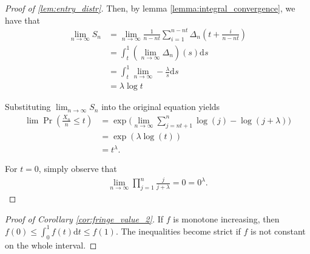 \documentclass[a4paper]{article}
\newcommand{\dt}{\mathrm{d}t}
\newcommand{\ds}{\mathrm{d}s}
\begin{document}
\begin{proof}[Proof of \cref{lem:entry_distr}]
    Then, by lemma \ref{lemma:integral_convergence}, we have that
    \begin{align*}
        \lim_{n \to \infty} S_n &= \lim_{n \to \infty} \frac{1}{n-nt} \sum_{i=1}^{n-nt} \Delta_n \left( t + \frac{i}{n - nt} \right) \\
        &= \int_t^1 (\lim_{n \to \infty} \Delta_n)(s) \ds \\
        &= \int_t^1 \lim_{n \to \infty} -\frac{\lambda}{s} \ds \\
        &= \lambda \log{t}
    \end{align*}

    Substituting $\lim_{n \to \infty} S_n$ into the original equation yields
    \begin{align*}
        \lim \Pr \left( \frac{X_n}{n} \leq t \right) &= \exp \Bigg( \lim_{n \to \infty} \sum_{j = nt + 1}^n \log(j) - \log(j+\lambda) \Bigg) \\
        &= \exp(\lambda \log(t)) \\
        &= t^\lambda.
    \end{align*}

    For $t=0$, simply observe that %
    \begin{align*}
        \lim_{n \to \infty} \prod_{j = 1}^n \frac{j}{j + \lambda} = 0 = 0^\lambda.
    \end{align*}
\end{proof}

\begin{proof}[Proof of Corollary \ref{cor:fringe_value_2}]
    If $f$ is monotone increasing, then $f(0) \leq \int_0^1 f(t) \dt \leq f(1)$.
    The inequalities become strict if $f$ is not constant on the whole interval.
\end{proof}
\end{document}
